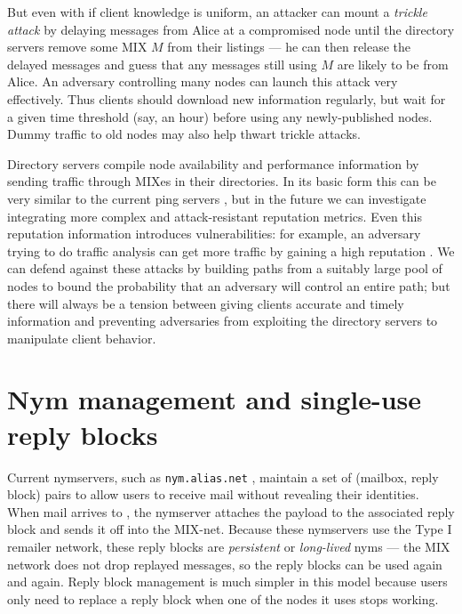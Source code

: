 \documentclass{llncs}
\newcommand\emailaddr{\begingroup \def\UrlLeft{<}\def\UrlRight{>}\urlstyle{tt}\Url}
\begin{document}
But even with if client knowledge is uniform, an attacker can mount a
\emph{trickle attack} by delaying messages from Alice at a compromised
node until the directory servers remove some MIX $M$ from their listings
--- he can then release the delayed messages and guess that any messages
still using $M$ are likely to be from Alice. An adversary controlling
many nodes can launch this attack very effectively. Thus clients
should download new information regularly,
but wait for a given time threshold (say, an hour) before using any
newly-published nodes. Dummy traffic to old nodes may also 
help thwart trickle attacks.

Directory servers compile node availability and performance information by
sending traffic through MIXes in their directories. In its basic form this
can be very similar to the current ping servers \cite{levien}, but in the
future we can investigate integrating more complex and attack-resistant
reputation metrics.   Even this reputation information introduces
vulnerabilities: for example, an adversary 
trying to do traffic analysis
can get more traffic by gaining a high reputation \cite{mix-acc}. We can
defend against these attacks by building paths from a suitably large pool
of nodes \cite{casc-rep} to bound the probability that an adversary will
control an entire path; but there will always be a tension between giving
clients accurate and timely information and preventing adversaries from
exploiting the directory servers to manipulate client behavior.



\section{Nym management and single-use reply blocks}
\label{sec:nymservers}

Current nymservers, such as {\tt nym.alias.net} \cite{nym-alias-net},
maintain a set of (mailbox, reply block) pairs to allow users to
receive mail without revealing their identities. When mail arrives to
\emailaddr{bob@nym.alias.net}, the nymserver attaches the payload to
the associated
reply block and sends it off into the MIX-net. Because these nymservers
use the Type I remailer network, these reply blocks are \emph{persistent}
or \emph{long-lived} nyms --- the MIX network does not drop replayed
messages, so the reply blocks can be used again and again. Reply block
management is much simpler in this model because users only need to
replace a reply block when one of the nodes it uses stops working.
\end{document}
